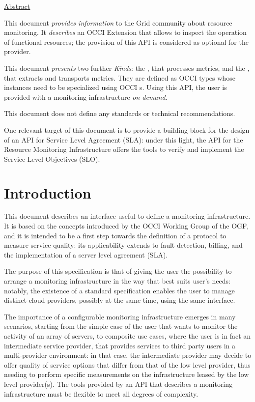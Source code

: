 \documentclass[10pt,a4paper]{article}
\begin{document}
\underline{Abstract}

This document {\em provides information} to the Grid community about resource monitoring. It {\em describes} an OCCI Extension that allows to inspect the operation of functional resources; the provision of this API is considered as optional for the provider.

This document {\em presents} two further {\em Kinds}: the \sens, that processes metrics, and the \coll, that extracts and transports metrics. They are defined as OCCI types whose instances need to be specialized using OCCI \mi s. Using this API, the user is provided with a monitoring infrastructure {\em on demand}.

This document does not define any standards or technical recommendations.

One relevant target of this document is to provide a building block for the design of an API for Service Level Agreement (SLA): under this light, the API for the Resource Monitoring Infrastructure offers the tools to verify and implement the Service Level Objectives (SLO).

\newpage
\tableofcontents
\newpage

\section{Introduction}

This document describes an interface useful to define a monitoring infrastructure. It is based on the concepts introduced by the OCCI Working Group of the OGF, and it is intended to be a first step towards the definition of a protocol to measure service quality: its applicability extends to fault detection, billing, and the implementation of a server level agreement (SLA).

The purpose of this specification is that of giving the user the possibility to arrange a monitoring infrastructure in the way that best suits user's needs: notably, the existence of a standard specification enables the user to manage distinct cloud providers, possibly at the same time, using the same interface.

The importance of a configurable monitoring infrastructure emerges in many scenarios, starting from the simple case of the user that wants to monitor the activity of an array of servers, to composite use cases, where the user is in fact an intermediate service provider, that provides services to third party users in a multi-provider environment: in that case, the intermediate provider may decide to offer quality of service options that differ from that of the low level provider, thus needing to perform specific measurements on the infrastructure leased by the low level provider(s). The tools provided by an API that describes a monitoring infrastructure must be flexible to meet all degrees of complexity.
\end{document}
